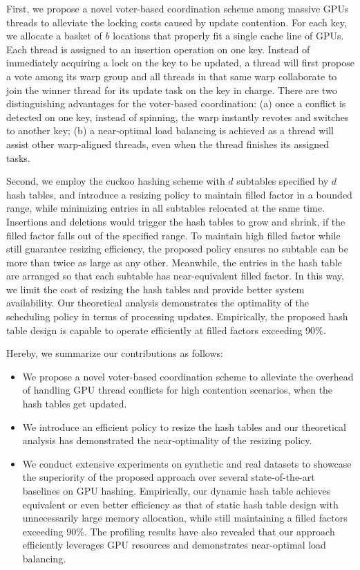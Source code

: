 First, we propose a novel voter-based coordination scheme among massive GPUs threads to alleviate the locking costs caused by update contention. 
For each key, we allocate a basket of $b$ locations that properly fit a single cache line of GPUs. Each thread is assigned to an insertion operation on one key. Instead of immediately acquiring a lock on the key to be updated, a thread will first propose a vote among its warp group and all threads in that same warp collaborate to join the winner thread for its update task on the key in charge. There are two distinguishing advantages for the voter-based coordination: (a) once a conflict is detected on one key, instead of spinning, the warp instantly revotes and switches to another key; (b) a near-optimal load balancing is achieved as a thread will assist other warp-aligned threads, even when the thread finishes its assigned tasks.

Second, we employ the cuckoo hashing scheme with $d$ subtables specified by $d$ hash tables, and introduce a resizing policy to maintain filled factor in a bounded range, while minimizing entries in all subtables relocated at the same time. Insertions and deletions would trigger the hash tables to grow and shrink, if the filled factor falls out of the specified range. To maintain high filled factor while still guarantee resizing efficiency, the proposed policy ensures no subtable can be more than twice as large as any other. Meanwhile, the entries in the hash table are arranged so that each subtable has near-equivalent filled factor.
 In this way, we limit the cost of resizing the hash tables and provide better system availability.
Our theoretical analysis demonstrates the optimality of the scheduling policy in terms of processing updates. 
Empirically, the proposed hash table design is capable to operate efficiently at filled factors exceeding 90\%.

Hereby, we summarize our contributions as follows:
\begin{itemize}
	\item We propose a novel voter-based coordination scheme to alleviate the overhead of handling GPU thread conflicts for high contention scenarios, when the hash tables get updated.  
	\item We introduce an efficient policy to resize the hash tables and our theoretical analysis has demonstrated the near-optimality of the resizing policy.
	\item We conduct extensive experiments on synthetic and real datasets to showcase the superiority of the proposed approach over several state-of-the-art baselines on GPU hashing. Empirically, our dynamic hash table achieves equivalent or even better efficiency as that of static hash table design with unnecessarily large memory allocation, while still maintaining a filled factors exceeding 90\%. The profiling results have also revealed that our approach efficiently leverages GPU resources and demonstrates near-optimal load balancing. 
\end{itemize}

